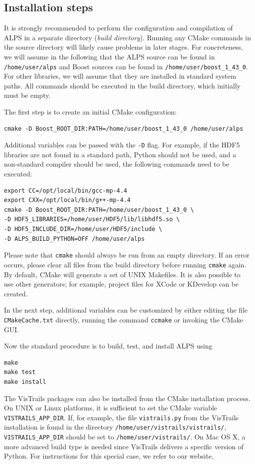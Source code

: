 \documentclass[12pt]{iopart}
\begin{document}
\subsection{Installation steps}

It is strongly recommended to perform the configuration and compilation of ALPS in a separate directory ({\it build directory}). Running any CMake commands in the source directory will likely cause problems in later stages.
For concreteness, we will assume in the following that the ALPS source can be found in {\tt /home/user/alps} and Boost sources can be found in {\tt /home/user/boost\_1\_43\_0}. For other libraries, we will assume that they are installed in standard system paths. All commands should be executed in the build directory, which initially must be empty.

The first step is to create an initial CMake configuration:
{\small
\begin{verbatim}
cmake -D Boost_ROOT_DIR:PATH=/home/user/boost_1_43_0 /home/user/alps
\end{verbatim} }
Additional variables can be passed with the {\tt -D} flag. For example, if the HDF5 libraries are not found in a standard path, Python should not be used, and a non-standard compiler should be used, the following commands need to be executed:
{\small
\begin{verbatim}
export CC=/opt/local/bin/gcc-mp-4.4
export CXX=/opt/local/bin/g++-mp-4.4
cmake -D Boost_ROOT_DIR:PATH=/home/user/boost_1_43_0 \
-D HDF5_LIBRARIES=/home/user/HDF5/lib/libhdf5.so \
-D HDF5_INCLUDE_DIR=/home/user/HDF5/include \
-D ALPS_BUILD_PYTHON=OFF /home/user/alps
\end{verbatim} }
Please note that {\tt cmake} should always be run from an empty directory. If an error occurs, please clear all files from the build directory before running {\tt cmake} again. By default, CMake will generate a set of UNIX Makefiles. It is also possible to use other generators; for example, project files for XCode or KDevelop can be created.

In the next step, additional variables can be customized by either editing the file {\tt CMakeCache.txt} directly, running the command {\tt ccmake} or invoking the CMake GUI.

Now the standard procedure is to build, test, and install ALPS using
{\small \begin{verbatim}
make
make test
make install
\end{verbatim}}

The VisTrails packages can also be installed from the CMake installation process. On UNIX or Linux platforms, it is sufficient to set the CMake variable {\tt VISTRAILS\_APP\_DIR}. If, for example, the file {\tt vistrails.py} from the VisTrails installation is found in the directory {\tt /home/user/vistrails/vistrails/}, {\tt VISTRAILS\_APP\_DIR} should be set to {\tt /home/user/vistrails/}.
On Mac OS X, a more advanced build type is needed since VisTrails delivers a specific version of Python. For instructions for this special case, we refer to our website.
\end{document}
